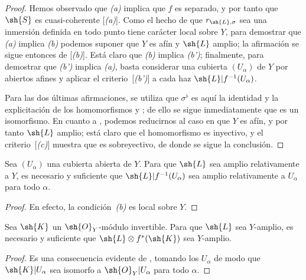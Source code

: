 \documentclass[oneside,10pt]{amsart}
\newcommand{\oldpage}[2][]{\marginnote{\normalfont\footnotesize\textbf{#1}~|~#2}\ignorespaces}
\let\EGAOriginalLabel\label
\renewcommand{\label}[1]{\phantomsection\EGAOriginalLabel{#1}}
\begin{document}
\begin{proof}
Hemos observado que \emph{(a)} implica que $f$ es separado, y por tanto que $\sh{S}$ es cuasi-coherente [\emph{(a)}].
Como el hecho de que $r_{\sh{L},\sigma}$ sea una inmersión definida en todo punto tiene carácter local sobre $Y$, para demostrar que \emph{(a)} implica \emph{(b)} podemos suponer que $Y$ es afín y $\sh{L}$ amplio;
\oldpage[II]{90}
la afirmación se sigue entonces de [\emph{(b)}].
Está claro que \emph{(b)} implica \emph{(b')};
finalmente, para demostrar que \emph{(b')} implica \emph{(a)}, basta considerar una cubierta $(U_\alpha)$ de $Y$ por abiertos afines y aplicar el criterio~[\emph{(b')}] a cada haz $\sh{L}|f^{-1}(U_\alpha)$.

Para las dos últimas afirmaciones, se utiliza que $\sigma^\flat$ es aquí la identidad y la explicitación de los homomorfismos  y ;
de ello se sigue inmediatamente que  es un isomorfismo.
En cuanto a , podemos reducirnos al caso en que $Y$ es afín, y por tanto $\sh{L}$ amplio;
está claro que el homomorfismo  es inyectivo, y el criterio~[\emph{(c)}] muestra que es sobreyectivo, de donde se sigue la conclusión.
\end{proof}

\begin{corollary}[4.6.4]
\label{II.4.6.4}
Sea $(U_\alpha)$ una cubierta abierta de $Y$.
Para que $\sh{L}$ sea amplio relativamente a $Y$, es necesario y suficiente que $\sh{L}|f^{-1}(U_\alpha)$ sea amplio relativamente a $U_\alpha$ para todo $\alpha$.
\end{corollary}

\begin{proof}
En efecto, la condición~\emph{(b)} es local sobre $Y$.
\end{proof}

\begin{corollary}[4.6.5]
\label{II.4.6.5}
Sea $\sh{K}$ un $\sh{O}_Y$-módulo invertible.
Para que $\sh{L}$ sea $Y$-amplio, es necesario y suficiente que $\sh{L}\otimes f^*(\sh{K})$ sea $Y$-amplio.
\end{corollary}

\begin{proof}
Es una consecuencia evidente de , tomando los $U_\alpha$ de modo que $\sh{K}|U_\alpha$ sea isomorfo a $\sh{O}_Y|U_\alpha$ para todo $\alpha$.
\end{proof}
\end{document}
